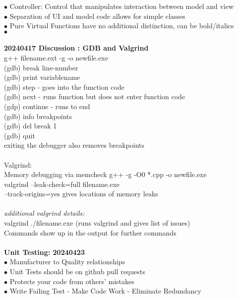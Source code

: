 \documentclass[11pt]{article}
\begin{document}
    \indent\indent $\bullet$ Controller: Control that manipulates interaction between model and view\\
    \indent\indent $\bullet$ Separation of UI and model code allows for simple classes \\
    \indent $\bullet$ Pure Virtual Functions have no additional distinction, can be bold/italics\\
    \indent $\bullet$ 
    \\ \\
    \textbf{20240417 Discussion : GDB and Valgrind}\\
    g++ filename.ext -g -o newfile.exe\\
    (gdb) break line-number\\
    (gdb) print variablename\\
    (gdb) step - goes into the function code\\
    (gdb) next - runs function but does not enter function code\\
    (gdp) continue - runs to end\\
    (gdb) info breakpoints\\
    (gdb) del break 1\\
    (gdb) quit\\
    exiting the debugger also removes breakpoints\\
\\
Valgrind:\\
Memory debugging via memcheck
g++ -g -O0 *.cpp -o newfile.exe\\
valgrind --leak-check=full filename.exe\\
--track-origins=yes gives locations of memory leaks\\
\\
\textit{additional valgrind details:}\\
valgrind ./filename.exe (runs valgrind and gives list of issues)\\
Commands show up in the output for further commands\\
\\
\textbf{Unit Testing: 20240423}\\
\indent $\bullet$ Manufacturer to Quality relationships \\
\indent $\bullet$ Unit Tests should be on github pull requests \\
\indent $\bullet$ Protects your code from others' mistakes \\
\indent $\bullet$ Write Failing Test - Make Code Work - Eliminate Redundancy \\
\end{document}
